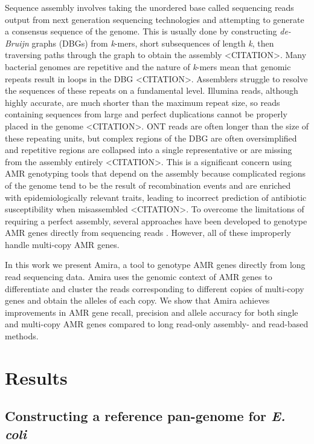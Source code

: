 Sequence assembly involves taking the unordered base called sequencing reads output from next generation sequencing technologies and attempting to generate a consensus sequence of the genome. This is usually done by constructing \textit{de-Bruijn} graphs (DBGs) from \textit{k}-mers, short subsequences of length \textit{k}, then traversing paths through the graph to obtain the assembly <CITATION>. Many bacterial genomes are repetitive and the nature of \textit{k}-mers mean that genomic repeats result in loops in the DBG <CITATION>. Assemblers struggle to resolve the sequences of these repeats on a fundamental level. Illumina reads, although highly accurate, are much shorter than the maximum repeat size, so reads containing sequences from large and perfect duplications cannot be properly placed in the genome <CITATION>. ONT reads are often longer than the size of these repeating units, but complex regions of the DBG are often oversimplified and repetitive regions are collapsed into a single representative or are missing from the assembly entirely <CITATION>. This is a significant concern using AMR genotyping tools that depend on the assembly because complicated regions of the genome tend to be the result of recombination events and are enriched with epidemiologically relevant traits, leading to incorrect prediction of antibiotic susceptibility when misassembled <CITATION>. To overcome the limitations of requiring a perfect assembly, several approaches have been developed to genotype AMR genes directly from sequencing reads \cite{Florensa2022, Bradley2015, Hunt2017}. However, all of these improperly handle multi-copy AMR genes.

In this work we present Amira, a tool to genotype AMR genes directly from long read sequencing data. Amira uses the genomic context of AMR genes to differentiate and cluster the reads corresponding to different copies of multi-copy genes and obtain the alleles of each copy. We show that Amira achieves improvements in AMR gene recall, precision and allele accuracy for both single and multi-copy AMR genes compared to long read-only assembly- and read-based methods. 

\section*{Results}

\subsection*{Constructing a reference pan-genome for \textit{E. coli}}

